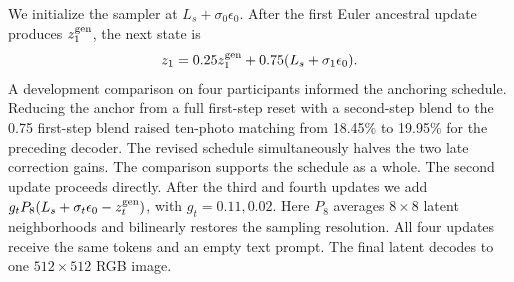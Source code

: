 \documentclass[letterpaper,10pt,conference]{IEEEtran}
\begin{document}
We initialize the sampler at \(L_s+\sigma_0\epsilon_0\). After the first Euler ancestral update produces \(z_1^{\rm gen}\), the next state is
\begin{equation}
z_1=0.25z_1^{\rm gen}+0.75(L_s+\sigma_1\epsilon_0).
\end{equation}
A development comparison on four participants informed the anchoring schedule. Reducing the anchor from a full first-step reset with a second-step blend to the 0.75 first-step blend raised ten-photo matching from 18.45\% to 19.95\% for the preceding decoder. The revised schedule simultaneously halves the two late correction gains. The comparison supports the schedule as a whole. The second update proceeds directly. After the third and fourth updates we add \(g_t P_8(L_s+\sigma_t\epsilon_0-z_t^{\rm gen})\), with \(g_t=0.11,0.02\). Here \(P_8\) averages \(8\times8\) latent neighborhoods and bilinearly restores the sampling resolution. All four updates receive the same tokens and an empty text prompt. The final latent decodes to one \(512\times512\) RGB image.
\end{document}
